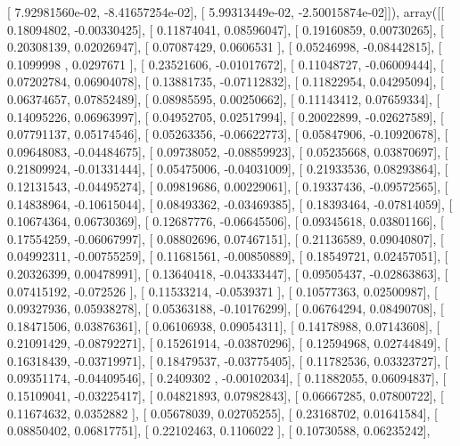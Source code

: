 \documentclass{article}
\begin{document}
       [  7.92981560e-02,  -8.41657254e-02],
       [  5.99313449e-02,  -2.50015874e-02]]), array([[ 0.18094802, -0.00330425],
       [ 0.11874041,  0.08596047],
       [ 0.19160859,  0.00730265],
       [ 0.20308139,  0.02026947],
       [ 0.07087429,  0.0606531 ],
       [ 0.05246998, -0.08442815],
       [ 0.1099998 ,  0.0297671 ],
       [ 0.23521606, -0.01017672],
       [ 0.11048727, -0.06009444],
       [ 0.07202784,  0.06904078],
       [ 0.13881735, -0.07112832],
       [ 0.11822954,  0.04295094],
       [ 0.06374657,  0.07852489],
       [ 0.08985595,  0.00250662],
       [ 0.11143412,  0.07659334],
       [ 0.14095226,  0.06963997],
       [ 0.04952705,  0.02517994],
       [ 0.20022899, -0.02627589],
       [ 0.07791137,  0.05174546],
       [ 0.05263356, -0.06622773],
       [ 0.05847906, -0.10920678],
       [ 0.09648083, -0.04484675],
       [ 0.09738052, -0.08859923],
       [ 0.05235668,  0.03870697],
       [ 0.21809924, -0.01331444],
       [ 0.05475006, -0.04031009],
       [ 0.21933536,  0.08293864],
       [ 0.12131543, -0.04495274],
       [ 0.09819686,  0.00229061],
       [ 0.19337436, -0.09572565],
       [ 0.14838964, -0.10615044],
       [ 0.08493362, -0.03469385],
       [ 0.18393464, -0.07814059],
       [ 0.10674364,  0.06730369],
       [ 0.12687776, -0.06645506],
       [ 0.09345618,  0.03801166],
       [ 0.17554259, -0.06067997],
       [ 0.08802696,  0.07467151],
       [ 0.21136589,  0.09040807],
       [ 0.04992311, -0.00755259],
       [ 0.11681561, -0.00850889],
       [ 0.18549721,  0.02457051],
       [ 0.20326399,  0.00478991],
       [ 0.13640418, -0.04333447],
       [ 0.09505437, -0.02863863],
       [ 0.07415192, -0.072526  ],
       [ 0.11533214, -0.0539371 ],
       [ 0.10577363,  0.02500987],
       [ 0.09327936,  0.05938278],
       [ 0.05363188, -0.10176299],
       [ 0.06764294,  0.08490708],
       [ 0.18471506,  0.03876361],
       [ 0.06106938,  0.09054311],
       [ 0.14178988,  0.07143608],
       [ 0.21091429, -0.08792271],
       [ 0.15261914, -0.03870296],
       [ 0.12594968,  0.02744849],
       [ 0.16318439, -0.03719971],
       [ 0.18479537, -0.03775405],
       [ 0.11782536,  0.03323727],
       [ 0.09351174, -0.04409546],
       [ 0.2409302 , -0.00102034],
       [ 0.11882055,  0.06094837],
       [ 0.15109041, -0.03225417],
       [ 0.04821893,  0.07982843],
       [ 0.06667285,  0.07800722],
       [ 0.11674632,  0.0352882 ],
       [ 0.05678039,  0.02705255],
       [ 0.23168702,  0.01641584],
       [ 0.08850402,  0.06817751],
       [ 0.22102463,  0.1106022 ],
       [ 0.10730588,  0.06235242],
\end{document}
